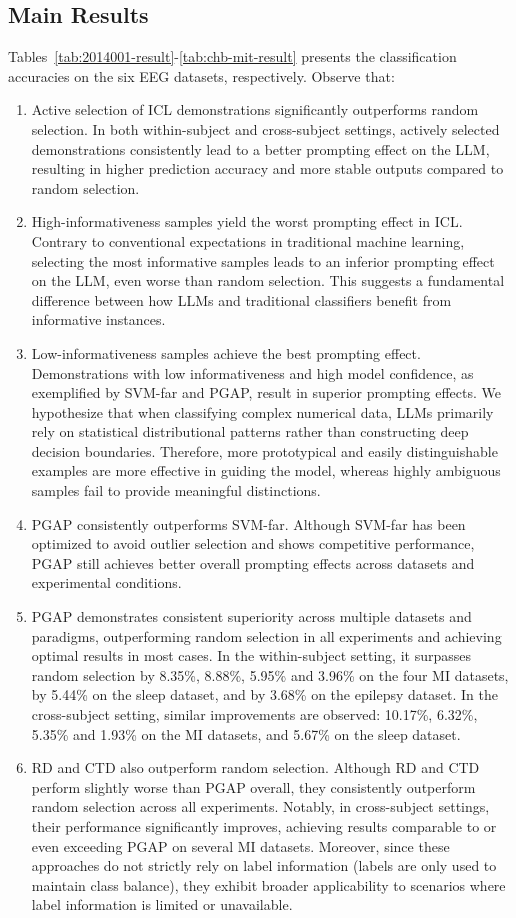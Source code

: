 \documentclass[journal,twocolumn]{IEEEtran}
\begin{document}
\subsection{Main Results}
Tables~\ref{tab:2014001-result}-\ref{tab:chb-mit-result} presents the classification accuracies on the six EEG datasets, respectively. Observe that:
\begin{enumerate}
  \item Active selection of ICL demonstrations significantly outperforms random selection. In both within-subject and cross-subject settings, actively selected demonstrations consistently lead to a better prompting effect on the LLM, resulting in higher prediction accuracy and more stable outputs compared to random selection.
  \item High-informativeness samples yield the worst prompting effect in ICL. Contrary to conventional expectations in traditional machine learning, selecting the most informative samples leads to an inferior prompting effect on the LLM, even worse than random selection. This suggests a fundamental difference between how LLMs and traditional classifiers benefit from informative instances.
  \item Low-informativeness samples achieve the best prompting effect. Demonstrations with low informativeness and high model confidence, as exemplified by SVM-far and PGAP, result in superior prompting effects. We hypothesize that when classifying complex numerical data, LLMs primarily rely on statistical distributional patterns rather than constructing deep decision boundaries. Therefore, more prototypical and easily distinguishable examples are more effective in guiding the model, whereas highly ambiguous samples fail to provide meaningful distinctions.
  \item PGAP consistently outperforms SVM-far. Although SVM-far has been optimized to avoid outlier selection and shows competitive performance, PGAP still achieves better overall prompting effects across datasets and experimental conditions.
  \item PGAP demonstrates consistent superiority across multiple datasets and paradigms, outperforming random selection in all experiments and achieving optimal results in most cases. In the within-subject setting, it surpasses random selection by 8.35\%, 8.88\%, 5.95\% and 3.96\% on the four MI datasets, by 5.44\% on the sleep dataset, and by 3.68\% on the epilepsy dataset. In the cross-subject setting, similar improvements are observed: 10.17\%, 6.32\%, 5.35\% and 1.93\% on the MI datasets, and 5.67\% on the sleep dataset.
  \item RD and CTD also outperform random selection. Although RD and CTD perform slightly worse than PGAP overall, they consistently outperform random selection across all experiments. Notably, in cross-subject settings, their performance significantly improves, achieving results comparable to or even exceeding PGAP on several MI datasets. Moreover, since these approaches do not strictly rely on label information (labels are only used to maintain class balance), they exhibit broader applicability to scenarios where label information is limited or unavailable.
\end{enumerate}
\end{document}
